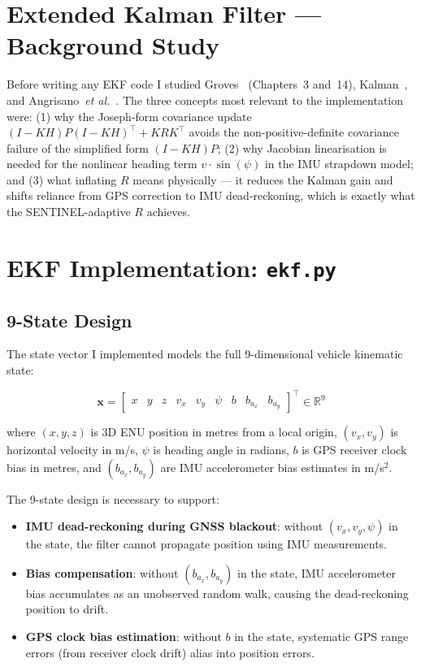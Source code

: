 \documentclass[12pt,a4paper]{article}
\begin{document}
\section{Extended Kalman Filter --- Background Study}

Before writing any EKF code I studied Groves~\cite{groves2013gnss} (Chapters~3 and~14),
Kalman~\cite{kalman1960}, and Angrisano~\emph{et al.}~\cite{angrisano2013imu}.
The three concepts most relevant to the implementation were: (1) why the Joseph-form
covariance update $(I - KH)P(I-KH)^\top + KRK^\top$ avoids the non-positive-definite
covariance failure of the simplified form $(I-KH)P$; (2) why Jacobian linearisation is
needed for the nonlinear heading term $v \cdot \sin(\psi)$ in the IMU strapdown model;
and (3) what inflating $R$ means physically --- it reduces the Kalman gain and shifts
reliance from GPS correction to IMU dead-reckoning, which is exactly what the
SENTINEL-adaptive $R$ achieves.

\section{EKF Implementation: \texttt{ekf.py}}

\subsection{9-State Design}

The state vector I implemented models the full 9-dimensional vehicle kinematic state:

\begin{equation}
  \mathbf{x} = \begin{bmatrix}
    x & y & z & v_x & v_y & \psi & b & b_{a_x} & b_{a_y}
  \end{bmatrix}^\top \in \mathbb{R}^9
\end{equation}

where $(x, y, z)$ is 3D ENU position in metres from a local origin,
$(v_x, v_y)$ is horizontal velocity in m/s,
$\psi$ is heading angle in radians,
$b$ is GPS receiver clock bias in metres,
and $(b_{a_x}, b_{a_y})$ are IMU accelerometer bias estimates in m/s$^2$.

The 9-state design is necessary to support:
\begin{itemize}
  \item \textbf{IMU dead-reckoning during GNSS blackout}: without $(v_x, v_y, \psi)$
    in the state, the filter cannot propagate position using IMU measurements.
  \item \textbf{Bias compensation}: without $(b_{a_x}, b_{a_y})$ in the state,
    IMU accelerometer bias accumulates as an unobserved random walk, causing the
    dead-reckoning position to drift.
  \item \textbf{GPS clock bias estimation}: without $b$ in the state, systematic
    GPS range errors (from receiver clock drift) alias into position errors.
\end{itemize}
\end{document}
